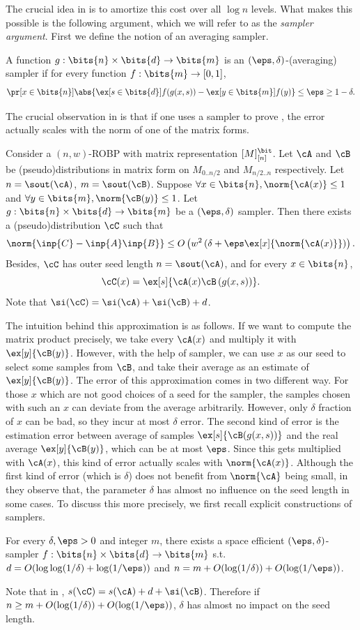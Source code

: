 The crucial idea in \cite{BCG18} is to amortize this cost over all $\log n$ levels. What makes this possible is the following argument, which we will refer to as the \emph{sampler argument}. First we define the notion of an averaging sampler. 
\begin{definition}
A function $g:\bits{n}\times\bits{d}\to\bits{m}$ is an $(\eps,\delta)$-(averaging) sampler if for every function $f:\bits{m}\to{[0,1]}$, $$\pr[x\in\bits{n}]{\abs{\ex[s\in\bits{d}]{f(g(x,s))}-\ex[y\in\bits{m}]{f(y)}}\le\eps}\ge 1-\delta.$$
\end{definition}
\noindent
The crucial observation in \cite{BCG18} is that if one uses a sampler to prove , the error actually scales with the norm of one of the matrix forms.
\begin{lemma}\label{lemma:samp-arg}
Consider a $(n,w)$-ROBP with matrix representation $[M]_{[n]}^{\bit}$. Let $\cA$ and $\cB$ be (pseudo)distributions in matrix form on $M_{0..n/2}$ and $M_{n/2..n}$ respectively. Let $n=\sout(\cA)$, $m=\sout(\cB)$. Suppose $\forall x\in\bits{n},\norm{\cA(x)}\le 1$ and $\forall y\in\bits{m},\norm{\cB(y)}\le 1$. Let $g:\bits{n}\times \bits{d}\to\bits{m}$ be a $(\eps,\delta)$ sampler. Then there exists a (pseudo)distribution $\cC$ such that 
$$\norm{\inp{C}-\inp{A}\inp{B}}\le O\left(w^2\left(\delta+\eps \ex[x]{\norm{\cA(x)}}\right)\right).$$
Besides, $\cC$ has outer seed length $n=\sout(\cA)$, and for every $x\in\bits{n}$, $$\cC(x)=\ex[s]{\cA(x)\cB\left(g(x,s)\right)}.$$
Note that $\si(\cC)=\si(\cA)+\si(\cB)+d$.
\end{lemma}
The intuition behind this approximation is as follows. If we want to compute the matrix product precisely, we take every $\cA(x)$ and multiply it with $\ex[y]{\cB(y)}$. However, with the help of sampler, we can use $x$ as our seed to select some samples from $\cB$, and take their average as an estimate of $\ex[y]{\cB(y)}$. The error of this approximation comes in two different way. For those $x$ which are not good choices of a seed for the sampler, the samples chosen with such an $x$ can deviate from the average arbitrarily. However, only $\delta$ fraction of $x$ can be bad, so they incur at most $\delta$ error. The second kind of error is the estimation error between average of samples $\ex[s]{\cB(g(x,s))}$ and the real average $\ex[y]{\cB(y)}$, which can be at most $\eps$. Since this gets multiplied  with $\cA(x)$, this kind of error actually scales with $\norm{\cA(x)}$. Although the first kind of error (which is $\delta$) does not benefit from $\norm{\cA}$ being small, in \cite{BCG18} they observe that, the parameter $\delta$ has almost no influence on the seed length in some cases. To discuss this more precisely, we first recall explicit constructions of samplers.
\begin{lemma}
For every $\delta,\eps>0$ and integer $m$, there exists a space efficient $(\eps,\delta)$-sampler $f:\bits{n}\times\bits{d}\to\bits{m}$ s.t. $d=O(\log\log(1/\delta)+\log(1/\eps))$ and $n=m+O(\log(1/\delta))+O(\log(1/\eps))$.
\end{lemma}
Note that in , $s(\cC)=s(\cA)+d+\si(\cB)$. Therefore if $n\ge m+O(\log(1/\delta))+O(\log(1/\eps))$, $\delta$ has almost no impact on the seed length. 

